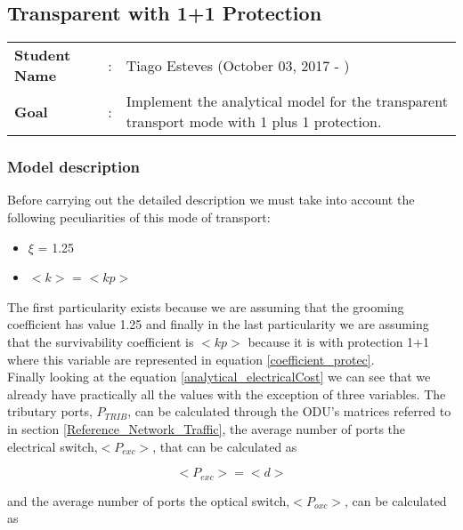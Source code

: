 \clearpage

\subsection{Transparent with 1+1 Protection}\label{analytical_Transp_Protection}
\begin{tcolorbox}	
\begin{tabular}{p{2.75cm} p{0.2cm} p{10.5cm}} 	
\textbf{Student Name}  &:& Tiago Esteves    (October 03, 2017 - )\\
\textbf{Goal}          &:& Implement the analytical model for the transparent transport mode with 1 plus 1 protection.
\end{tabular}
\end{tcolorbox}

\subsubsection{Model description}

Before carrying out the detailed description we must take into account the following peculiarities of this mode of transport:
\begin{itemize}
  \item $\xi$ = 1.25
  \item $<k>$ = $<kp>$
\end{itemize}

\vspace{11pt}
The first particularity exists because we are assuming that the grooming coefficient has value 1.25 and finally in the last particularity we are assuming that the survivability coefficient is $<kp>$ because it is with protection 1+1 where this variable are represented in equation \ref{coefficient_protec}.\\

Finally looking at the equation \ref{analytical_electricalCost} we can see that we already have practically all the values with the exception of three variables. The tributary ports, $P_{TRIB}$, can be calculated through the ODU's matrices referred to in section \ref{Reference_Network_Traffic}, the average number of ports the electrical switch,$<P_{exc}>$, that can be calculated as

\begin{equation}
<P_{exc}> = <d>
\label{Pexc_transp_protec}
\end{equation}

\vspace{11pt}
\noindent
and the average number of ports the optical switch,$<P_{oxc}>$, can be calculated as

